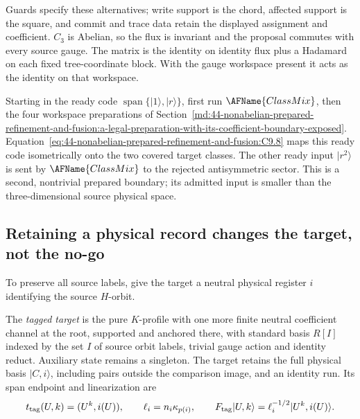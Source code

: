 Guards specify these alternatives; write support is the chord, affected
support is the square, and commit and trace data retain the displayed
assignment and coefficient.  $C_3$ is Abelian, so the flux is invariant and the
proposal commutes with every source gauge.  The matrix is the identity on
identity flux plus a Hadamard on each fixed tree-coordinate block.  With the
gauge workspace present it acts as the identity on that workspace.

Starting in the ready code $\operatorname{span}\{|1\rangle,|r\rangle\}$, first
run $\AFName{ClassMix}$, then the four workspace preparations of
Section~\ref{md:44-nonabelian-prepared-refinement-and-fusion:a-legal-preparation-with-its-coefficient-boundary-exposed}.
Equation~\eqref{eq:44-nonabelian-prepared-refinement-and-fusion:C9.8} maps this
ready code isometrically onto the two covered target classes.  The other ready
input $|r^2\rangle$ is sent by $\AFName{ClassMix}$ to the rejected antisymmetric
sector.  This is a second, nontrivial prepared boundary; its admitted input is
smaller than the three-dimensional source physical space.

\subsection{Retaining a physical record changes the target, not the no-go}\label{md:44-nonabelian-prepared-refinement-and-fusion:retaining-a-physical-record-changes-the-target-not-the-no-go}

To preserve all source labels, give the target a neutral physical register
$i$ identifying the source $H$-orbit.

\begin{definition}\label{def:tagged-target}
The \emph{tagged target} is the pure $K$-profile with one more finite neutral
coefficient channel at the root, supported and anchored there, with standard
basis $R[I]$ indexed by the set $I$ of source orbit labels, trivial gauge
action and identity reduct.  Auxiliary state remains a singleton.  The target
retains the full physical basis $|C,i\rangle$, including pairs outside the
comparison image, and an identity run.  Its span endpoint and linearization
are
\begin{equation}
t_{\rm tag}(U,k)=(U^k,i(U)),\qquad
 \ell_i=n_i\kappa_{p(i)},\qquad
 F_{\rm tag}|U,k\rangle=\ell_i^{-1/2}|U^k,i(U)\rangle.
 \label{eq:44-nonabelian-prepared-refinement-and-fusion:C9.15}
\end{equation}
\end{definition}

